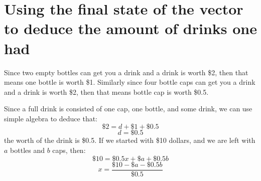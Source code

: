 \documentclass[letterpaper, 12pt]{article}
\begin{document}
\section{Using the final state of the vector to deduce the amount of drinks one had}
\par Since two empty bottles can get you a drink and a drink is worth \$2, then that means one bottle is worth \$1.
Similarly since four bottle caps can get you a drink and a drink is worth \$2, then that means bottle cap is worth \$0.5.
\par Since a full drink is consisted of one cap, one bottle, and some drink, we can use simple algebra to deduce that:
\begin{equation}
	\$2 = d + \$1 + \$0.5
\end{equation}
\begin{equation}
	d = \$0.5
\end{equation}
the worth of the drink is \$0.5.
If we started with \$10 dollars, and we are left with $a$ bottles and $b$ caps, then:
\begin{equation}
	\$10 = \$0.5x + \$a + \$0.5b
\end{equation}
\begin{equation}
	x = \frac{\$10 - \$a - \$0.5b}{\$0.5}
\end{equation}
\end{document}
